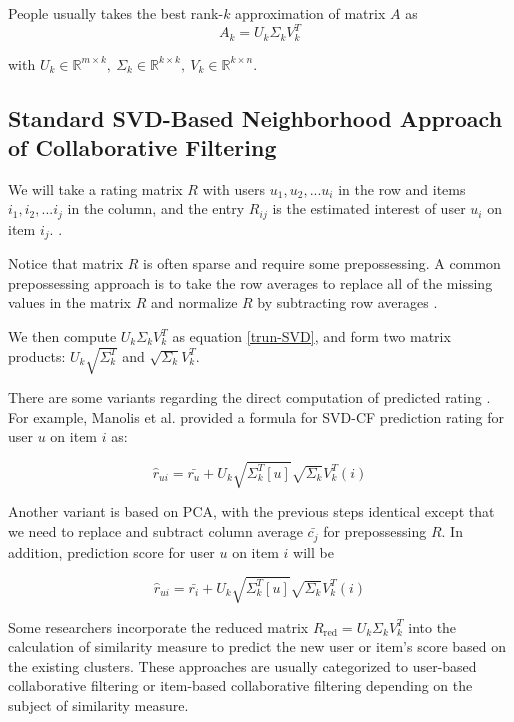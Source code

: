 \documentclass[letter paper, 11pt]{article}
\begin{document}
	People usually takes the best rank-$k$ approximation of matrix $A$ as 
	\begin{equation} \label{trun-SVD}
		A_k = U_k \Sigma_k V_k^T
	\end{equation}
	
	with $U_k \in \mathbb{R}^{m \times k}, \ \Sigma_k \in \mathbb{R}^{k \times k}, \ V_k \in \mathbb{R}^{k \times n}$.
	
	\subsection{Standard SVD-Based Neighborhood Approach of Collaborative Filtering}	
	We will take a rating matrix $R$ with users $u_1, u_2, ... u_i$ in the row and items $i_1, i_2, ... i_j$ in the column, and the entry $R_{ij}$ is the estimated interest of user $u_i$ on item $i_j$. \cite{MFinRS} \cite{CF-IterPCA} \cite{ApplySVD}.
	
	Notice that matrix $R$ is often sparse and require some prepossessing. A common prepossessing approach is to take the row averages to replace all of the missing values in the matrix $R$ and normalize $R$ by subtracting row averages \cite{ApplySVD} \cite{CF-IterPCA}.
	
	We then compute $U_k \Sigma_k V_k^T$ as equation \ref{trun-SVD}, and form two matrix products: $U_k \sqrt{\Sigma_k^T}$ and $\sqrt{\Sigma_k} V_k^T$.
	
	There are some variants regarding the direct computation of predicted rating \cite{ApplySVD} \cite{SVD-performance}. For example, Manolis et al. \cite{SVD-performance} provided a formula for SVD-CF prediction rating for user $u$ on item $i$ as:
	
	\begin{equation}
		\hat{r}_{ui} = \bar{r_u} + U_k \sqrt{\Sigma_k^T [u]} \sqrt{\Sigma_k} V_k^T (i)
	\end{equation}
	
	Another variant is based on PCA, with the previous steps identical except that we need to replace and subtract column average $\bar{c_j}$ for prepossessing $R$. In addition, prediction score for user $u$ on item $i$ will be
	
	\begin{equation}
		\hat{r}_{ui} = \bar{r_i} + U_k \sqrt{\Sigma_k^T [u]} \sqrt{\Sigma_k} V_k^T (i)
	\end{equation}

	Some researchers incorporate the reduced matrix $R_{\text{red}} = U_k \Sigma_k V_k^T$ into the calculation of similarity measure to predict the new user or item's score based on the existing clusters. These approaches are usually categorized to user-based collaborative filtering or item-based collaborative filtering depending on the subject of similarity measure.
	
\end{document}
